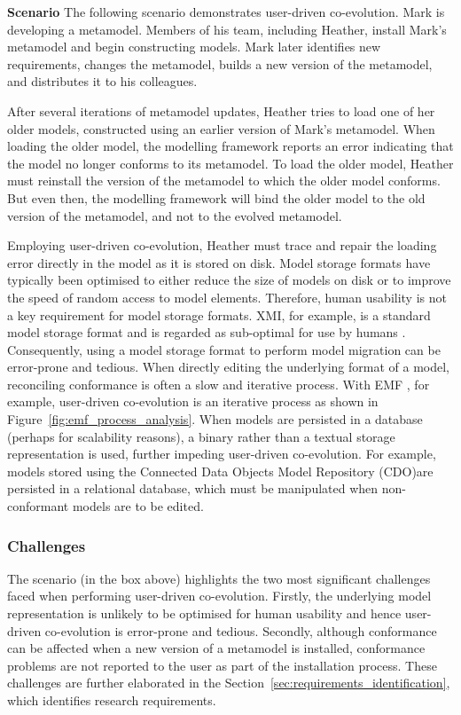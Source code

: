 \begin{framed}
\textbf{Scenario}
The following scenario demonstrates user-driven co-evolution. Mark is developing a metamodel. Members of his team, including Heather, install Mark's metamodel and begin constructing models. Mark later identifies new requirements, changes the metamodel, builds a new version of the metamodel, and distributes it to his colleagues.

After several iterations of metamodel updates, Heather tries to load one of her older models, constructed using an earlier version of Mark's metamodel. When loading the older model, the modelling framework reports an error indicating that the model no longer conforms to its metamodel. To load the older model, Heather must reinstall the version of the metamodel to which the older model conforms. But even then, the modelling framework will bind the older model to the old version of the metamodel, and not to the evolved metamodel.

Employing user-driven co-evolution, Heather must trace and repair the loading error directly in the model as it is stored on disk. Model storage formats have typically been optimised to either reduce the size of models on disk or to improve the speed of random access to model elements. Therefore, human usability is not a key requirement for model storage formats. XMI, for example, is a standard model storage format and is regarded as sub-optimal for use by humans \cite{hutn}. Consequently, using a model storage format to perform model migration can be error-prone and tedious. When directly editing the underlying format of a model, reconciling conformance is often a slow and iterative process. With EMF \cite{steinberg09emf}, for example, user-driven co-evolution is an iterative process as shown in Figure~\ref{fig:emf_process_analysis}. When models are persisted in a database (perhaps for scalability reasons), a binary rather than a textual storage representation is used, further impeding user-driven co-evolution. For example, models stored using the Connected Data Objects Model Repository (CDO)\footnotemark \space are persisted in a relational database, which must be manipulated when non-conformant models are to be edited.
\end{framed}

\subsubsection{Challenges}
The scenario (in the box above) highlights the two most significant challenges faced when performing user-driven co-evolution. Firstly, the underlying model representation is unlikely to be optimised for human usability and hence user-driven co-evolution is error-prone and tedious. Secondly, although conformance can be affected when a new version of a metamodel is installed, conformance problems are not reported to the user as part of the installation process. These challenges are further elaborated in the Section~\ref{sec:requirements_identification}, which identifies research requirements.

